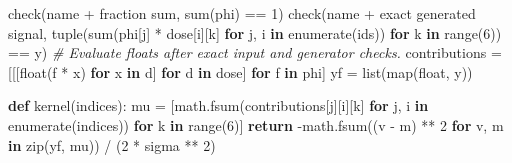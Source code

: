 \documentclass[
]{article}
\newenvironment{Shaded}{}{}
\newcommand{\BuiltInTok}[1]{\textcolor[rgb]{0.00,0.50,0.00}{#1}}
\newcommand{\CommentTok}[1]{\textcolor[rgb]{0.38,0.63,0.69}{\textit{#1}}}
\newcommand{\ControlFlowTok}[1]{\textcolor[rgb]{0.00,0.44,0.13}{\textbf{#1}}}
\newcommand{\DecValTok}[1]{\textcolor[rgb]{0.25,0.63,0.44}{#1}}
\newcommand{\KeywordTok}[1]{\textcolor[rgb]{0.00,0.44,0.13}{\textbf{#1}}}
\newcommand{\NormalTok}[1]{#1}
\newcommand{\OperatorTok}[1]{\textcolor[rgb]{0.40,0.40,0.40}{#1}}
\newcommand{\StringTok}[1]{\textcolor[rgb]{0.25,0.44,0.63}{#1}}
\begin{document}
\begin{Shaded}
\begin{Highlighting}[]
\NormalTok{        check(name }\OperatorTok{+} \StringTok{\textquotesingle{} fraction sum\textquotesingle{}}\NormalTok{, }\BuiltInTok{sum}\NormalTok{(phi) }\OperatorTok{==} \DecValTok{1}\NormalTok{)}
\NormalTok{        check(name }\OperatorTok{+} \StringTok{\textquotesingle{} exact generated signal\textquotesingle{}}\NormalTok{,}
              \BuiltInTok{tuple}\NormalTok{(}\BuiltInTok{sum}\NormalTok{(phi[j] }\OperatorTok{*}\NormalTok{ dose[i][k] }\ControlFlowTok{for}\NormalTok{ j, i }\KeywordTok{in} \BuiltInTok{enumerate}\NormalTok{(ids))}
                    \ControlFlowTok{for}\NormalTok{ k }\KeywordTok{in} \BuiltInTok{range}\NormalTok{(}\DecValTok{6}\NormalTok{)) }\OperatorTok{==}\NormalTok{ y)}
        \CommentTok{\# Evaluate floats after exact input and generator checks.}
\NormalTok{        contributions }\OperatorTok{=}\NormalTok{ [[[}\BuiltInTok{float}\NormalTok{(f }\OperatorTok{*}\NormalTok{ x) }\ControlFlowTok{for}\NormalTok{ x }\KeywordTok{in}\NormalTok{ d] }\ControlFlowTok{for}\NormalTok{ d }\KeywordTok{in}\NormalTok{ dose] }\ControlFlowTok{for}\NormalTok{ f }\KeywordTok{in}\NormalTok{ phi]}
\NormalTok{        yf }\OperatorTok{=} \BuiltInTok{list}\NormalTok{(}\BuiltInTok{map}\NormalTok{(}\BuiltInTok{float}\NormalTok{, y))}

        \KeywordTok{def}\NormalTok{ kernel(indices):}
\NormalTok{            mu }\OperatorTok{=}\NormalTok{ [math.fsum(contributions[j][i][k] }\ControlFlowTok{for}\NormalTok{ j, i }\KeywordTok{in} \BuiltInTok{enumerate}\NormalTok{(indices))}
                  \ControlFlowTok{for}\NormalTok{ k }\KeywordTok{in} \BuiltInTok{range}\NormalTok{(}\DecValTok{6}\NormalTok{)]}
            \ControlFlowTok{return} \OperatorTok{{-}}\NormalTok{math.fsum((v }\OperatorTok{{-}}\NormalTok{ m) }\OperatorTok{**} \DecValTok{2} \ControlFlowTok{for}\NormalTok{ v, m }\KeywordTok{in} \BuiltInTok{zip}\NormalTok{(yf, mu)) }\OperatorTok{/}\NormalTok{ (}\DecValTok{2} \OperatorTok{*}\NormalTok{ sigma }\OperatorTok{**} \DecValTok{2}\NormalTok{)}


\end{Highlighting}
\end{Shaded}
\end{document}
